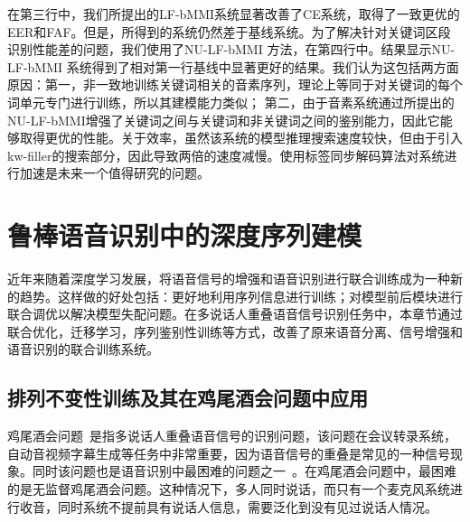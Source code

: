 在第三行中，我们所提出的LF-bMMI系统显著改善了CE系统，取得了一致更优的EER和FAF。但是，所得到的系统仍然差于基线系统。为了解决针对关键词区段识别性能差的问题，我们使用了NU-LF-bMMI 方法，在第四行中。结果显示NU-LF-bMMI 系统得到了相对第一行基线中显著更好的结果。我们认为这包括两方面原因：第一，非一致地训练关键词相关的音素序列，理论上等同于对关键词的每个词单元专门进行训练，所以其建模能力类似； 第二，由于音素系统通过所提出的NU-LF-bMMI增强了关键词之间与关键词和非关键词之间的鉴别能力，因此它能够取得更优的性能。关于效率，虽然该系统的模型推理搜索速度较快，但由于引入kw-filler的搜索部分，因此导致两倍的速度减慢。使用标签同步解码算法对系统进行加速是未来一个值得研究的问题。


\section{鲁棒语音识别中的深度序列建模}
\label{chap:intro2-pit}

近年来随着深度学习发展，将语音信号的增强和语音识别进行联合训练成为一种新的趋势。这样做的好处包括：更好地利用序列信息进行训练；对模型前后模块进行联合调优以解决模型失配问题。在多说话人重叠语音信号识别任务中，本章节通过联合优化，迁移学习，序列鉴别性训练等方式，改善了原来语音分离、信号增强和语音识别的联合训练系统。

\subsection{排列不变性训练及其在鸡尾酒会问题中应用}
\label{chap:intro2-pit-pit}

鸡尾酒会问题~\cite{cherry1953some,bregman1994auditory}是指多说话人重叠语音信号的识别问题，该问题在会议转录系统，自动音视频字幕生成等任务中非常重要，因为语音信号的重叠是常见的一种信号现象。同时该问题也是语音识别中最困难的问题之一~\cite{wang2006computational,cooke2010monaural,du2014speech,weng2015deep}。在鸡尾酒会问题中，最困难的是无监督鸡尾酒会问题。这种情况下，多人同时说话，而只有一个麦克风系统进行收音，同时系统不提前具有说话人信息，需要泛化到没有见过说话人情况。


